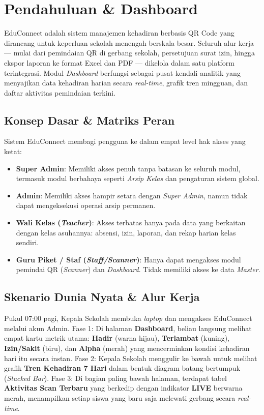 \chapter{Pendahuluan \& Dashboard}

EduConnect adalah sistem manajemen kehadiran berbasis QR Code yang dirancang untuk keperluan sekolah menengah berskala besar. Seluruh alur kerja --- mulai dari pemindaian QR di gerbang sekolah, persetujuan surat izin, hingga ekspor laporan ke format Excel dan PDF --- dikelola dalam satu platform terintegrasi. Modul \textit{Dashboard} berfungsi sebagai pusat kendali analitik yang menyajikan data kehadiran harian secara \textit{real-time}, grafik tren mingguan, dan daftar aktivitas pemindaian terkini.

\section{Konsep Dasar \& Matriks Peran}

Sistem EduConnect membagi pengguna ke dalam empat level hak akses yang ketat:

\begin{itemize}
    \item \textbf{Super Admin}: Memiliki akses penuh tanpa batasan ke seluruh modul, termasuk modul berbahaya seperti \textit{Arsip Kelas} dan pengaturan sistem global.
    \item \textbf{Admin}: Memiliki akses hampir setara dengan \textit{Super Admin}, namun tidak dapat mengeksekusi operasi arsip permanen.
    \item \textbf{Wali Kelas (\textit{Teacher})}: Akses terbatas hanya pada data yang berkaitan dengan kelas asuhannya: absensi, izin, laporan, dan rekap harian kelas sendiri.
    \item \textbf{Guru Piket / Staf (\textit{Staff/Scanner})}: Hanya dapat mengakses modul pemindai QR (\textit{Scanner}) dan \textit{Dashboard}. Tidak memiliki akses ke data \textit{Master}.
\end{itemize}

\section{Skenario Dunia Nyata \& Alur Kerja}

Pukul 07:00 pagi, Kepala Sekolah membuka \textit{laptop} dan mengakses EduConnect melalui akun Admin. Fase 1: Di halaman \textbf{Dashboard}, beliau langsung melihat empat kartu metrik utama: \textbf{Hadir} (warna hijau), \textbf{Terlambat} (kuning), \textbf{Izin/Sakit} (biru), dan \textbf{Alpha} (merah) yang mencerminkan kondisi kehadiran hari itu secara instan. Fase 2: Kepala Sekolah menggulir ke bawah untuk melihat grafik \textbf{Tren Kehadiran 7 Hari} dalam bentuk diagram batang bertumpuk (\textit{Stacked Bar}). Fase 3: Di bagian paling bawah halaman, terdapat tabel \textbf{Aktivitas Scan Terbaru} yang berkedip dengan indikator \textbf{LIVE} berwarna merah, menampilkan setiap siswa yang baru saja melewati gerbang secara \textit{real-time}.

